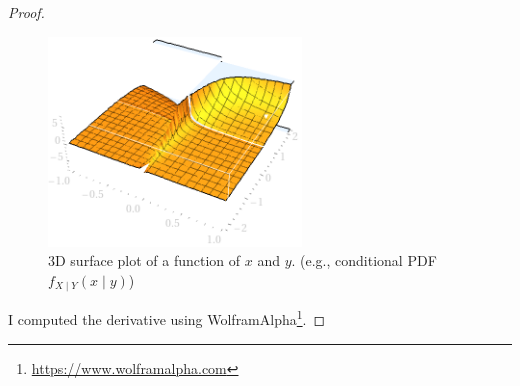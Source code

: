 \documentclass[12pt]{amsart}
\theoremstyle{remark}
\numberwithin{equation}{section} \numberwithin{thm}{section}
\numberwithin{rmk}{section} \numberwithin{figure}{section}
\begin{document}
\begin{proof}
\vspace{1em}


\begin{figure}[h]
\centering
\includegraphics[width=0.6\textwidth]{conditionalpb-ruler.png}
\caption{3D surface plot of a function of \( x \) and \( y \). (e.g., conditional PDF \( f_{X \mid Y}(x \mid y) \))}
\label{fig:conditional_pdf}
\end{figure}




I computed the derivative using WolframAlpha\footnote{\url{https://www.wolframalpha.com}}.
\end{proof}
\end{document}
